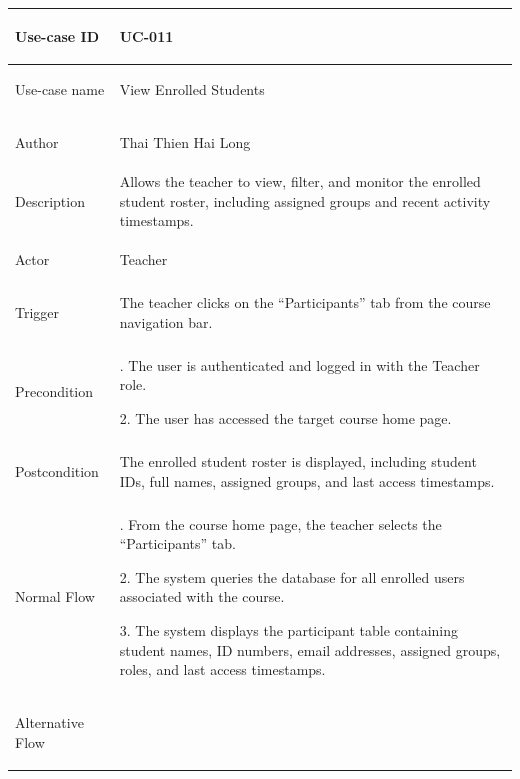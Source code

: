 {
\renewcommand{\arraystretch}{1.1}
\setlength{\tabcolsep}{8pt}
\begin{longtable}{|>{\bfseries\raggedright\arraybackslash}p{}|>{\raggedright\arraybackslash}p{}|}
\hline
Use-case ID & UC-011 \\ \hline
Use-case name & View Enrolled Students \\ \hline
Author & Thai Thien Hai Long \\ \hline
Description &
Allows the teacher to view, filter, and monitor the enrolled student roster, including assigned groups and recent activity timestamps. \\ \hline
Actor & Teacher \\ \hline
Trigger &
The teacher clicks on the ``Participants'' tab from the course navigation bar. \\ \hline
Precondition &
1. The user is authenticated and logged in with the Teacher role.\par
2. The user has accessed the target course home page. \\ \hline
Postcondition &
The enrolled student roster is displayed, including student IDs, full names, assigned groups, and last access timestamps. \\ \hline
Normal Flow &
1. From the course home page, the teacher selects the ``Participants'' tab.\par
2. The system queries the database for all enrolled users associated with the course.\par
3. The system displays the participant table containing student names, ID numbers, email addresses, assigned groups, roles, and last access timestamps. \\ \hline
Alternative Flow &

\end{longtable}}
